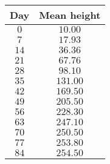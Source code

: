 \begin{tabular}{cc} \toprule
Day  & Mean height \\\midrule
$0$  & $10.00$  \\
$7$  & $17.93$  \\
$14$ & $36.36$  \\
$21$ & $67.76$  \\
$28$ & $98.10$  \\
$35$ & $131.00$ \\
$42$ & $169.50$ \\
$49$ & $205.50$ \\
$56$ & $228.30$ \\
$63$ & $247.10$ \\
$70$ & $250.50$ \\
$77$ & $253.80$ \\
$84$ & $254.50$ \\\bottomrule
\end{tabular}
